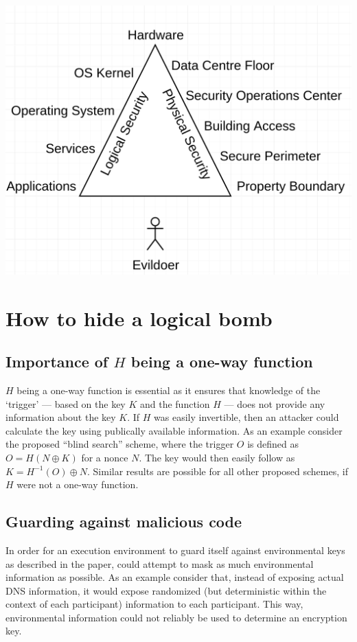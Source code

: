 \documentclass[a4paper]{scrreprt}
\begin{document}
\includegraphics[width=\textwidth]{combined_security_model}

\section{How to hide a logical bomb}

\subsection{Importance of $H$ being a one-way function}

$H$ being a one-way function is essential as it ensures that knowledge of the
`trigger' --- based on the key $K$ and the function $H$ --- does not provide
any information about the key $K$. If $H$ was easily invertible, then an
attacker could calculate the key using publically available information.  As an
example consider the proposed ``blind search'' scheme, where the trigger $O$ is
defined as $O = H(N \oplus K)$ for a nonce $N$. The key would then easily
follow as $K = H^{-1}(O) \oplus N$. Similar results are possible for all
other proposed schemes, if $H$ were not a one-way function.

\subsection{Guarding against malicious code}

In order for an execution environment to guard itself against environmental
keys as described in the paper, could attempt to mask as much environmental
information as possible. As an example consider that, instead of exposing
actual DNS information, it would expose randomized (but deterministic within
the context of each participant) information to each participant. This way,
environmental information could not reliably be used to determine an encryption
key.
\end{document}
